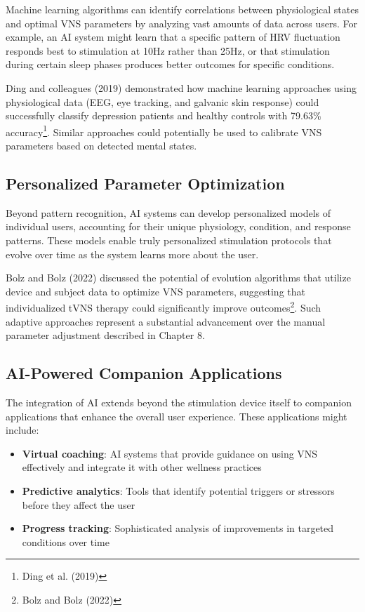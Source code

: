 \documentclass[
  Letterpaper,
]{scrbook}
\providecommand{\tightlist}{%
  \setlength{\itemsep}{0pt}\setlength{\parskip}{0pt}}\usepackage{longtable,booktabs,array}
\begin{document}
Machine learning algorithms can identify correlations between
physiological states and optimal VNS parameters by analyzing vast
amounts of data across users. For example, an AI system might learn that
a specific pattern of HRV fluctuation responds best to stimulation at
10Hz rather than 25Hz, or that stimulation during certain sleep phases
produces better outcomes for specific conditions.

Ding and colleagues (2019) demonstrated how machine learning approaches
using physiological data (EEG, eye tracking, and galvanic skin response)
could successfully classify depression patients and healthy controls
with 79.63\% accuracy\footnote{Ding et al. (2019)}. Similar approaches
could potentially be used to calibrate VNS parameters based on detected
mental states.

\subsection{Personalized Parameter
Optimization}\label{personalized-parameter-optimization}

Beyond pattern recognition, AI systems can develop personalized models
of individual users, accounting for their unique physiology, condition,
and response patterns. These models enable truly personalized
stimulation protocols that evolve over time as the system learns more
about the user.

Bolz and Bolz (2022) discussed the potential of evolution algorithms
that utilize device and subject data to optimize VNS parameters,
suggesting that individualized tVNS therapy could significantly improve
outcomes\footnote{Bolz and Bolz (2022)}. Such adaptive approaches
represent a substantial advancement over the manual parameter adjustment
described in Chapter 8.

\subsection{AI-Powered Companion
Applications}\label{ai-powered-companion-applications}

The integration of AI extends beyond the stimulation device itself to
companion applications that enhance the overall user experience. These
applications might include:

\begin{itemize}
\tightlist
\item
  \textbf{Virtual coaching}: AI systems that provide guidance on using
  VNS effectively and integrate it with other wellness practices
\item
  \textbf{Predictive analytics}: Tools that identify potential triggers
  or stressors before they affect the user
\item
  \textbf{Progress tracking}: Sophisticated analysis of improvements in
  targeted conditions over time
\end{itemize}
\end{document}
